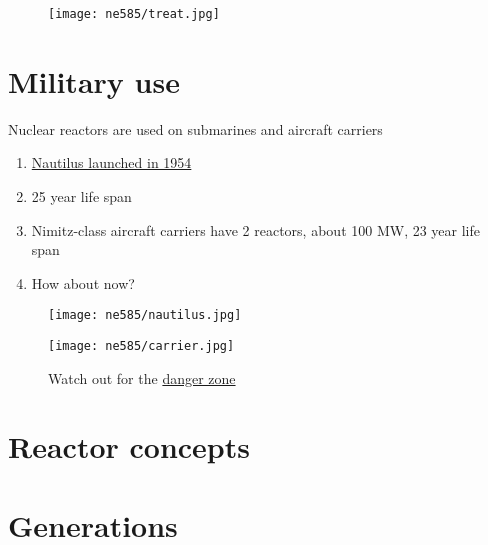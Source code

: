 \documentclass[aspectratio=1610,pdftex,dvipsnames,compress,xcolor={dvipsnames}]{beamer}
\begin{document}
\begin{frame}{}
    \begin{figure}
        \centering
        \texttt{[image: ne585/treat.jpg]}
    \end{figure}
\end{frame}


\section{Military use}


\addtocounter{framenumber}{-1} 
\begin{frame}{Nuclear reactors are used on submarines and aircraft carriers}
    \begin{enumerate}[series=outerlist,topsep=0pt,itemsep=21pt,leftmargin=*,label=(\arabic*)]
        \item[]\href{https://www.independent.co.uk/life-style/history/a-day-that-shook-the-world-first-nuclear-submarine-launched-2189571.html}{Nautilus launched in 1954}
        \item[]25 year life span
        \item[]Nimitz-class aircraft carriers have 2 reactors, about 100 MW, 23 year life span
        \item[]How about now?
    \end{enumerate}
\end{frame}


\begin{frame}{}
    \begin{figure}
        \centering
        \texttt{[image: ne585/nautilus.jpg]}
    \end{figure}
\end{frame}


\begin{frame}{}
    \begin{figure}
        \centering
        \texttt{[image: ne585/carrier.jpg]}
        \caption*{Watch out for the \href{https://youtu.be/siwpn14IE7E}{danger zone}}
    \end{figure}
\end{frame}


\section{Reactor concepts}
\section{Generations}
\end{document}
